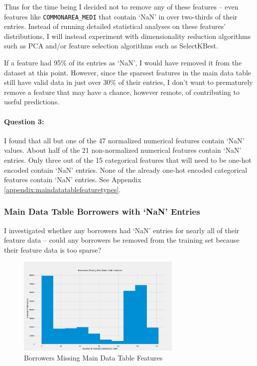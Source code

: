 \documentclass[12pt, letterpaper]{article}
\begin{document}
Thus for the time being I decided not to remove any of these features -- even features like \colorbox{backcolor}{\textcolor{black}{\texttt{COMMONAREA_MEDI}}} that contain `NaN' in over two-thirds of their entries. Instead of running detailed statistical analyses on these features' distributions, I will instead experiment with dimensionality reduction algorithms such as PCA and/or feature selection algorithms such as SelectKBest.

If a feature had 95\% of its entries as `NaN', I would have removed it from the dataset at this point. However, since the sparsest features in the main data table still have valid data in just over 30\% of their entries, I don't want to prematurely remove a feature that may have a chance, however remote, of contributing to useful predictions.

\paragraph{Question 3:}
I found that all but one of the 47 normalized numerical features contain `NaN' values. About half of the 21 non-normalized numerical features contain `NaN' entries. Only three out of the 15 categorical features that will need to be one-hot encoded contain `NaN' entries. None of the already one-hot encoded categorical features contain `NaN' entries. See Appendix \ref{appendix:maindatatablefeaturetypes}.

\subsubsection{Main Data Table Borrowers with `NaN' Entries}
I investigated whether any borrowers had `NaN' entries for nearly all of their feature data -- could any borrowers be removed from the training set because their feature data is too sparse?

\begin{figure}[ht]
\includegraphics[width=0.7\textwidth]{borrowersnandata}
\centering
\caption{Borrowers Missing Main Data Table Features}
\end{figure}
\end{document}
